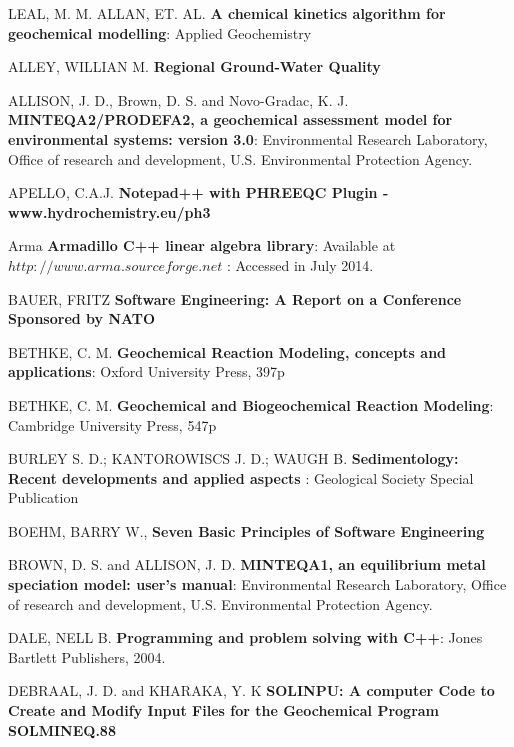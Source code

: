 \documentclass[ppgc,mestrado,English]{iiufrgs}
\begin{document}
\begin{thebibliography}{este-parametro-nao-eh-usado-pelo-estilo-ABNT}

 LEAL, M. M. ALLAN, ET. AL.
\textbf{A chemical kinetics algorithm for geochemical modelling}: Applied Geochemistry

 ALLEY, WILLIAN M.
\textbf{Regional Ground-Water Quality}

 ALLISON, J. D., Brown, D. S. and Novo-Gradac, K. J.
\textbf{MINTEQA2/PRODEFA2, a geochemical assessment model for environmental systems: version 3.0}: Environmental Research Laboratory, Office of research and development, U.S. Environmental Protection Agency.

 APELLO, C.A.J.
\textbf{Notepad++ with PHREEQC Plugin - www.hydrochemistry.eu/ph3}

 Arma
\textbf{Armadillo C++ linear algebra library}: Available at $http://www.arma.sourceforge.net$ : Accessed in July 2014.

 BAUER, FRITZ
\textbf{Software Engineering: A Report on a Conference Sponsored by NATO}

 BETHKE, C. M.
\textbf{Geochemical Reaction Modeling, concepts and applications}: Oxford University Press, 397p

 BETHKE, C. M.
\textbf{Geochemical and Biogeochemical Reaction Modeling}: Cambridge University Press, 547p


 BURLEY S. D.; KANTOROWISCS J. D.; WAUGH B.
\textbf{Sedimentology: Recent developments and applied aspects} : Geological Society Special Publication

 BOEHM, BARRY W.,
\textbf{Seven Basic Principles of Software Engineering}

 BROWN, D. S. and ALLISON, J. D.
\textbf{MINTEQA1, an equilibrium metal speciation model: user's manual}: Environmental Research Laboratory, Office of research and development, U.S. Environmental Protection Agency.

 DALE, NELL B.
\textbf{Programming and problem solving with C++}: Jones Bartlett Publishers, 2004.

 DEBRAAL, J. D. and KHARAKA, Y. K
\textbf{SOLINPU: A computer Code to Create and Modify Input Files for the Geochemical Program SOLMINEQ.88}


\end{thebibliography}
\end{document}
